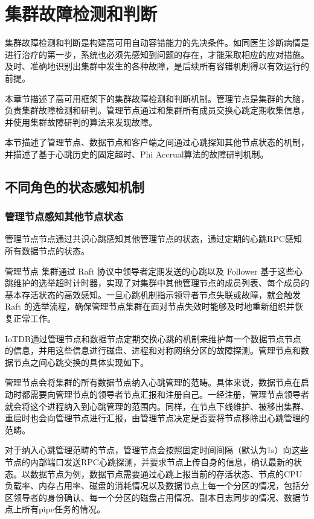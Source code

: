 
\chapter{集群故障检测和判断}

集群故障检测和判断是构建高可用自动容错能力的先决条件。如同医生诊断病情是进行治疗的第一步，系统也必须先感知到问题的存在，才能采取相应的应对措施。及时、准确地识别出集群中发生的各种故障，是后续所有容错机制得以有效运行的前提。

本章节描述了高可用框架下的集群故障检测和判断机制。管理节点是集群的大脑，负责集群故障检测和研判。管理节点通过和集群所有成员交换心跳定期收集信息，并使用集群故障研判的算法来发现故障。

本节描述了管理节点、数据节点和客户端之间通过心跳探知其他节点状态的机制，并描述了基于心跳历史的固定超时、Phi Accrual算法的故障研判机制。


\section{不同角色的状态感知机制}

\subsection{管理节点感知其他节点状态}

管理节点节点通过共识心跳感知其他管理节点的状态，通过定期的心跳RPC感知所有数据节点的状态。

管理节点 集群通过 Raft 协议中领导者定期发送的心跳以及 Follower 基于这些心跳维护的选举超时计时器，实现了对集群中其他管理节点的成员列表、每个成员的基本存活状态的高效感知。一旦心跳机制指示领导者节点失联或故障，就会触发 Raft 的选举流程，确保管理节点集群在面对节点失效时能够及时地重新组织并恢复正常工作。

IoTDB通过管理节点和数据节点定期交换心跳的机制来维护每一个数据节点节点的信息，并用这些信息进行磁盘、进程和对称网络分区的故障探测。管理节点和数据节点之间心跳交换的具体实现如下。

管理节点会将集群的所有数据节点纳入心跳管理的范畴。具体来说，数据节点在启动时都需要向管理节点的领导者节点汇报和注册自己。一经注册，管理节点领导者就会将这个进程纳入到心跳管理的范围内。同样，在节点下线维护、被移出集群、重启时也会向管理节点进行汇报，由管理节点决定是否要将节点移除出心跳管理的范畴。

对于纳入心跳管理范畴的节点，管理节点会按照固定时间间隔（默认为1s）向这些节点的内部端口发送RPC心跳探测，并要求节点上传自身的信息，确认最新的状态。以数据节点为例，数据节点需要通过心跳上报当前的存活状态、节点的CPU负载率、内存占用率、磁盘的消耗情况以及数据节点上每一个分区的情况，包括分区领导者的身份确认、每一个分区的磁盘占用情况、副本日志同步的情况、数据节点上所有pipe任务的情况。

